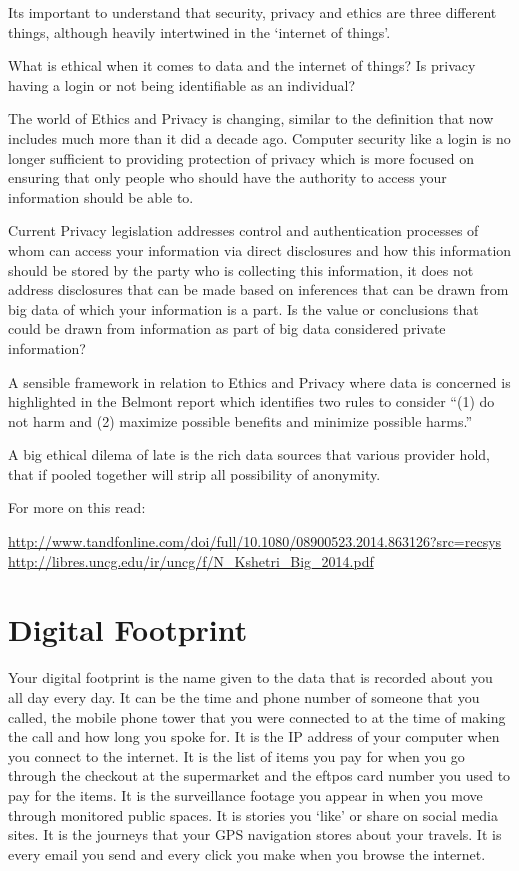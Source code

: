\documentclass[]{book}
\theoremstyle{definition}
\theoremstyle{definition}
\theoremstyle{remark}
\begin{document}
Its important to understand that security, privacy and ethics are three
different things, although heavily intertwined in the `internet of
things'.

What is ethical when it comes to data and the internet of things? Is
privacy having a login or not being identifiable as an individual?

The world of Ethics and Privacy is changing, similar to the definition
that now includes much more than it did a decade ago. Computer security
like a login is no longer sufficient to providing protection of privacy
which is more focused on ensuring that only people who should have the
authority to access your information should be able to.

Current Privacy legislation addresses control and authentication
processes of whom can access your information via direct disclosures and
how this information should be stored by the party who is collecting
this information, it does not address disclosures that can be made based
on inferences that can be drawn from big data of which your information
is a part. Is the value or conclusions that could be drawn from
information as part of big data considered private information?

A sensible framework in relation to Ethics and Privacy where data is
concerned is highlighted in the Belmont report which identifies two
rules to consider ``(1) do not harm and (2) maximize possible benefits
and minimize possible harms.''

A big ethical dilema of late is the rich data sources that various
provider hold, that if pooled together will strip all possibility of
anonymity.

For more on this read:

\url{http://www.tandfonline.com/doi/full/10.1080/08900523.2014.863126?src=recsys}
\url{http://libres.uncg.edu/ir/uncg/f/N_Kshetri_Big_2014.pdf}

\section{Digital Footprint}\label{digital-footprint}

Your digital footprint is the name given to the data that is recorded
about you all day every day. It can be the time and phone number of
someone that you called, the mobile phone tower that you were connected
to at the time of making the call and how long you spoke for. It is the
IP address of your computer when you connect to the internet. It is the
list of items you pay for when you go through the checkout at the
supermarket and the eftpos card number you used to pay for the items. It
is the surveillance footage you appear in when you move through
monitored public spaces. It is stories you `like' or share on social
media sites. It is the journeys that your GPS navigation stores about
your travels. It is every email you send and every click you make when
you browse the internet.
\end{document}
